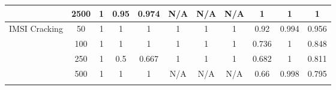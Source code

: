\begin{table*}[]
{\begin{tabular}{ccccccccccc}
			\multicolumn{1}{|c|}{}                                            & \multicolumn{1}{c|}{2500}          & \multicolumn{1}{c|}{1}                       & \multicolumn{1}{c|}{0.95}                 & \multicolumn{1}{c|}{0.974}            & \multicolumn{1}{c|}{N/A}                      & \multicolumn{1}{c|}{N/A}                   & \multicolumn{1}{c|}{N/A}               & \multicolumn{1}{c|}{1}                      & \multicolumn{1}{c|}{1}                   & \multicolumn{1}{c|}{1}               \\ \hline
			\multicolumn{1}{|c|}{\multirow{6}{*}{IMSI Cracking}}              & \multicolumn{1}{c|}{50}            & \multicolumn{1}{c|}{1}                       & \multicolumn{1}{c|}{1}                    & \multicolumn{1}{c|}{1}                & \multicolumn{1}{c|}{1}                        & \multicolumn{1}{c|}{1}                     & \multicolumn{1}{c|}{1}                 & \multicolumn{1}{c|}{0.92}                   & \multicolumn{1}{c|}{0.994}               & \multicolumn{1}{c|}{0.956}           \\ \cline{2-11}
			\multicolumn{1}{|c|}{}                                            & \multicolumn{1}{c|}{100}           & \multicolumn{1}{c|}{1}                       & \multicolumn{1}{c|}{1}                    & \multicolumn{1}{c|}{1}                & \multicolumn{1}{c|}{1}                        & \multicolumn{1}{c|}{1}                     & \multicolumn{1}{c|}{1}                 & \multicolumn{1}{c|}{0.736}                  & \multicolumn{1}{c|}{1}                   & \multicolumn{1}{c|}{0.848}           \\ \cline{2-11}
			\multicolumn{1}{|c|}{}                                            & \multicolumn{1}{c|}{250}           & \multicolumn{1}{c|}{1}                       & \multicolumn{1}{c|}{0.5}                  & \multicolumn{1}{c|}{0.667}            & \multicolumn{1}{c|}{1}                        & \multicolumn{1}{c|}{1}                     & \multicolumn{1}{c|}{1}                 & \multicolumn{1}{c|}{0.682}                  & \multicolumn{1}{c|}{1}                   & \multicolumn{1}{c|}{0.811}           \\ \cline{2-11}
			\multicolumn{1}{|c|}{}                                            & \multicolumn{1}{c|}{500}           & \multicolumn{1}{c|}{1}                       & \multicolumn{1}{c|}{1}                    & \multicolumn{1}{c|}{1}                & \multicolumn{1}{c|}{N/A}                      & \multicolumn{1}{c|}{N/A}                   & \multicolumn{1}{c|}{N/A}               & \multicolumn{1}{c|}{0.66}                   & \multicolumn{1}{c|}{0.998}               & \multicolumn{1}{c|}{0.795}           \\ \cline{2-11}

\end{tabular}}
\end{table*}
